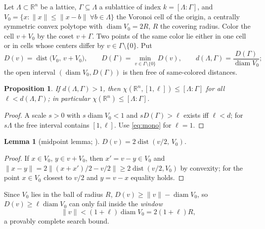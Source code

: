 \documentclass[10pt]{article}
\theoremstyle{plain}
\newtheorem{proposition}[theorem]{Proposition}
\newtheorem{lemma}[theorem]{Lemma}
\theoremstyle{remark}
\newcommand{\R}{\mathbb{R}}
\newcommand{\diam}{\operatorname{diam}}
\newcommand{\dist}{\operatorname{dist}}
\begin{document}
Let $\Lambda\subset\R^n$ be a lattice, $\Gamma\subseteq\Lambda$ a sublattice
of index $k=[\Lambda:\Gamma]$, and $V_0=\{x:\|x\|\le\|x-b\|\ \forall
b\in\Lambda\}$ the Voronoi cell of the origin, a centrally symmetric convex
polytope with $\diam V_0=2R$, $R$ the covering radius. Color the cell $v+V_0$
by the coset $v+\Gamma$. Two points of the same color lie either in one cell
or in cells whose centers differ by $v\in\Gamma\setminus\{0\}$. Put
\begin{equation}\label{eq:defs}
D(v)=\dist\bigl(V_0,\,v+V_0\bigr),\qquad
D(\Gamma)=\min_{v\in\Gamma\setminus\{0\}}D(v),\qquad
d(\Lambda,\Gamma)=\frac{D(\Gamma)}{\diam V_0};
\end{equation}
the open interval $(\diam V_0,D(\Gamma))$ is then free of same-colored
distances.

\begin{proposition}\label{prop:crit}
If $d(\Lambda,\Gamma)>1$, then $\chi(\R^n,[1,\ell])\le[\Lambda:\Gamma]$ for
all $\ell<d(\Lambda,\Gamma)$; in particular $\chi(\R^n)\le[\Lambda:\Gamma]$.
\end{proposition}

\begin{proof}
A scale $s>0$ with $s\diam V_0<1$ and $sD(\Gamma)>\ell$ exists iff
$\ell<d$; for $s\Lambda$ the free interval contains $[1,\ell]$. Use
\eqref{eq:mono} for $\ell=1$.
\end{proof}

\begin{lemma}[midpoint lemma; {\cite[Lemma~2]{Ivanov2011}}]\label{lem:mid}
$D(v)=2\dist(v/2,\,V_0)$.
\end{lemma}

\begin{proof}
If $x\in V_0$, $y\in v+V_0$, then $x'=v-y\in V_0$ and
$\|x-y\|=2\|(x+x')/2-v/2\|\ge2\dist(v/2,V_0)$ by convexity; for the point
$x\in V_0$ closest to $v/2$ and $y=v-x$ equality holds.
\end{proof}

Since $V_0$ lies in the ball of radius $R$, $D(v)\ge\|v\|-\diam V_0$, so
$D(v)\ge\ell\diam V_0$ can only fail inside the \emph{window}
\begin{equation}\label{eq:window}
\|v\|<(1+\ell)\diam V_0=2(1+\ell)R ,
\end{equation}
a provably complete search bound.
\end{document}
